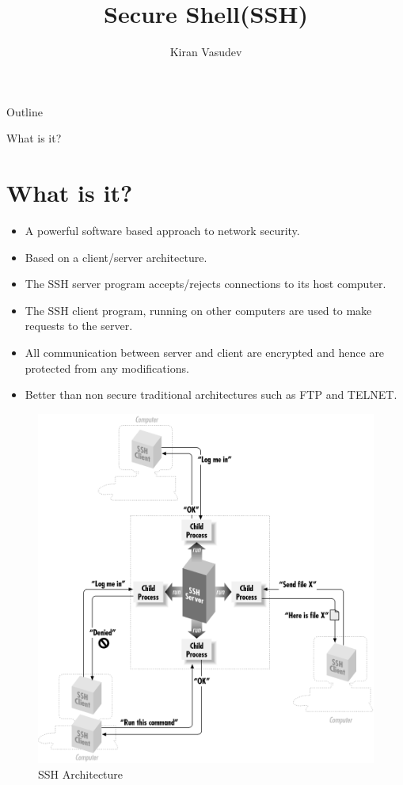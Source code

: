 \documentclass{beamer}
\title{Secure Shell(SSH)}
\author{Kiran Vasudev\inst{1}}
\institute[]
{
	\inst{1}
	Hochschule Bonn-Rhein-Sieg
	
}
\begin{document}
	
	\begin{frame}
	\titlepage
\end{frame}

\begin{frame}{Outline}
\tableofcontents
\end{frame}

\begin{frame}[allowframebreaks]{What is it?}
\section{What is it?}

	\begin{itemize}
		\item {
			A powerful software based approach to network security.
		}
		\item {
			Based on a client/server architecture.
		}
		\item{The SSH server program accepts/rejects connections to its host computer.}
		
		\item{
			The SSH client program, running on other computers are used to make requests to the server.
		}
		\item{
			All communication between server and client are encrypted and hence are protected from any modifications.
		}
		\item{Better than non secure traditional architectures such as FTP and TELNET.}
		
	\end{itemize}
	\begin{figure}
		\includegraphics[scale=0.4]{images/arch}
		\caption{SSH Architecture\cite{arch}}
	\end{figure}
	


\end{frame}
\end{document}
